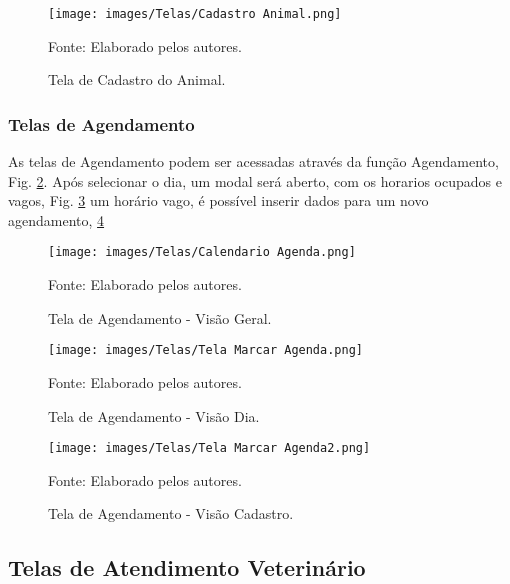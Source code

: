\documentclass[
    12pt,               %
    openright,          %
    oneside,
    a4paper,            %
    BIBLATEX,           %
    TODO,               %
    english,            %
    brazil              %
    ]{ifsp-spo-inf-ctds}
\begin{document}
\begin{figure}[H]
                \centering
                \caption{Tela de Cadastro do Animal.}
                \texttt{[image: images/Telas/Cadastro Animal.png]}

                \label{fig:CadAnimal}
                \centering
        {\footnotesize Fonte: Elaborado pelos autores.}
            \end{figure}    

\subsubsection{Telas de Agendamento}

As telas de Agendamento podem ser acessadas através da função Agendamento, Fig. \ref{fig:Calendario}. Após selecionar o dia, um modal será aberto, com os horarios ocupados e vagos, Fig. \ref{fig:Agenda}  um horário vago, é possível inserir dados para um novo agendamento, \ref{fig:Agenda2}


\begin{figure}[H]
                \centering
                \caption{Tela de Agendamento - Visão Geral.}
                \texttt{[image: images/Telas/Calendario Agenda.png]}

                \label{fig:Calendario}
                \centering
        {\footnotesize Fonte: Elaborado pelos autores.}
            \end{figure}    

\begin{figure}[H]
                \centering
                \caption{Tela de Agendamento - Visão Dia.}
                \texttt{[image: images/Telas/Tela Marcar Agenda.png]}

                \label{fig:Agenda}
                \centering
        {\footnotesize Fonte: Elaborado pelos autores.}
            \end{figure}    


\begin{figure}[H]
                \centering
                \caption{Tela de Agendamento - Visão Cadastro.}
                \texttt{[image: images/Telas/Tela Marcar Agenda2.png]}

                \label{fig:Agenda2}
                \centering
        {\footnotesize Fonte: Elaborado pelos autores.}
            \end{figure}    

    \subsection{Telas de Atendimento Veterinário}
\end{document}
